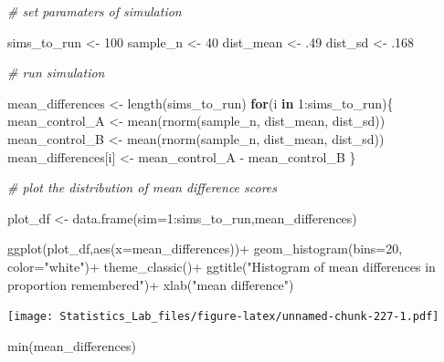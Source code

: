 \documentclass[
]{book}
\newenvironment{Shaded}{\begin{snugshade}}{\end{snugshade}}
\newcommand{\AttributeTok}[1]{\textcolor[rgb]{0.77,0.63,0.00}{#1}}
\newcommand{\CommentTok}[1]{\textcolor[rgb]{0.56,0.35,0.01}{\textit{#1}}}
\newcommand{\ControlFlowTok}[1]{\textcolor[rgb]{0.13,0.29,0.53}{\textbf{#1}}}
\newcommand{\DecValTok}[1]{\textcolor[rgb]{0.00,0.00,0.81}{#1}}
\newcommand{\FunctionTok}[1]{\textcolor[rgb]{0.00,0.00,0.00}{#1}}
\newcommand{\NormalTok}[1]{#1}
\newcommand{\OtherTok}[1]{\textcolor[rgb]{0.56,0.35,0.01}{#1}}
\newcommand{\SpecialCharTok}[1]{\textcolor[rgb]{0.00,0.00,0.00}{#1}}
\newcommand{\StringTok}[1]{\textcolor[rgb]{0.31,0.60,0.02}{#1}}
\begin{document}
\begin{Shaded}
\begin{Highlighting}[]
\CommentTok{\# set paramaters of simulation}

\NormalTok{sims\_to\_run }\OtherTok{\textless{}{-}} \DecValTok{100}
\NormalTok{sample\_n   }\OtherTok{\textless{}{-}} \DecValTok{40}
\NormalTok{dist\_mean  }\OtherTok{\textless{}{-}}\NormalTok{ .}\DecValTok{49}
\NormalTok{dist\_sd    }\OtherTok{\textless{}{-}}\NormalTok{ .}\DecValTok{168}

\CommentTok{\# run simulation}

\NormalTok{mean\_differences }\OtherTok{\textless{}{-}} \FunctionTok{length}\NormalTok{(sims\_to\_run)}
\ControlFlowTok{for}\NormalTok{(i }\ControlFlowTok{in} \DecValTok{1}\SpecialCharTok{:}\NormalTok{sims\_to\_run)\{}
\NormalTok{  mean\_control\_A      }\OtherTok{\textless{}{-}} \FunctionTok{mean}\NormalTok{(}\FunctionTok{rnorm}\NormalTok{(sample\_n, dist\_mean, dist\_sd))}
\NormalTok{  mean\_control\_B      }\OtherTok{\textless{}{-}} \FunctionTok{mean}\NormalTok{(}\FunctionTok{rnorm}\NormalTok{(sample\_n, dist\_mean, dist\_sd))}
\NormalTok{  mean\_differences[i] }\OtherTok{\textless{}{-}}\NormalTok{ mean\_control\_A }\SpecialCharTok{{-}}\NormalTok{ mean\_control\_B}
\NormalTok{\}}

\CommentTok{\# plot the  distribution of mean difference scores}

\NormalTok{plot\_df }\OtherTok{\textless{}{-}} \FunctionTok{data.frame}\NormalTok{(}\AttributeTok{sim=}\DecValTok{1}\SpecialCharTok{:}\NormalTok{sims\_to\_run,mean\_differences)}

\FunctionTok{ggplot}\NormalTok{(plot\_df,}\FunctionTok{aes}\NormalTok{(}\AttributeTok{x=}\NormalTok{mean\_differences))}\SpecialCharTok{+}
  \FunctionTok{geom\_histogram}\NormalTok{(}\AttributeTok{bins=}\DecValTok{20}\NormalTok{, }\AttributeTok{color=}\StringTok{"white"}\NormalTok{)}\SpecialCharTok{+}
  \FunctionTok{theme\_classic}\NormalTok{()}\SpecialCharTok{+}
  \FunctionTok{ggtitle}\NormalTok{(}\StringTok{"Histogram of mean differences in proportion remembered"}\NormalTok{)}\SpecialCharTok{+}
  \FunctionTok{xlab}\NormalTok{(}\StringTok{"mean difference"}\NormalTok{)}
\end{Highlighting}
\end{Shaded}

\texttt{[image: Statistics\_Lab\_files/figure-latex/unnamed-chunk-227-1.pdf]}

\begin{Shaded}
\begin{Highlighting}[]
\FunctionTok{min}\NormalTok{(mean\_differences)}
\end{Highlighting}
\end{Shaded}
\end{document}
